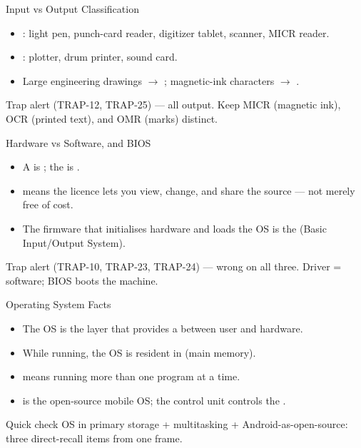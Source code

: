 \documentclass[aspectratio=169]{beamer}
\begin{document}
\begin{frame}{Input vs Output Classification}
  \begin{itemize}
    \item {}: light pen, punch-card reader, digitizer tablet,
      scanner, MICR reader.
    \item {}: plotter, drum printer, sound card.
    \item Large engineering drawings $\rightarrow$ ;
      magnetic-ink characters $\rightarrow$ .
  \end{itemize}
  \begin{alertblock}{Trap alert (TRAP-12, TRAP-25)}
     --- all output.
    Keep MICR (magnetic ink), OCR (printed text), and OMR (marks) distinct.
  \end{alertblock}
\end{frame}

\begin{frame}{Hardware vs Software, and BIOS}
  \begin{itemize}
    \item A  is ; the 
      is .
    \item {} means the licence lets you view, change, and share
      the source --- not merely free of cost.
    \item The firmware that initialises hardware and loads the OS is the
       (Basic Input/Output System).
  \end{itemize}
  \begin{alertblock}{Trap alert (TRAP-10, TRAP-23, TRAP-24)}
     --- wrong on all three. Driver = software; BIOS boots the machine.
  \end{alertblock}
\end{frame}

\begin{frame}{Operating System Facts}
  \begin{itemize}
    \item The OS is the layer that provides a 
      between user and hardware.
    \item While running, the OS is resident in  (main
      memory).
    \item {} means running more than one program at a time.
    \item {} is the open-source mobile OS; the control unit controls
      the .
  \end{itemize}
  \begin{exampleblock}{Quick check}
    OS in primary storage + multitasking + Android-as-open-source: three
    direct-recall items from one frame.
  \end{exampleblock}
\end{frame}
\end{document}
